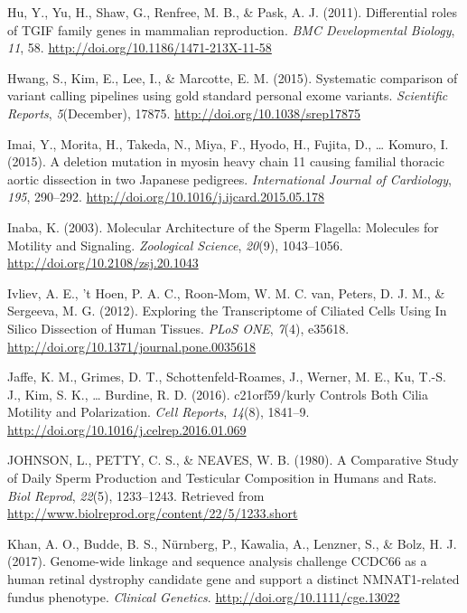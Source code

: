 \documentclass[12pt,twoside]{reedthesis}
\theoremstyle{definition}
\theoremstyle{definition}
\theoremstyle{remark}
\begin{document}
  \hypertarget{ref-Hu2011}{}
  Hu, Y., Yu, H., Shaw, G., Renfree, M. B., \& Pask, A. J. (2011).
  Differential roles of TGIF family genes in mammalian reproduction.
  \emph{BMC Developmental Biology}, \emph{11}, 58.
  \url{http://doi.org/10.1186/1471-213X-11-58}
  
  \hypertarget{ref-Hwang2015}{}
  Hwang, S., Kim, E., Lee, I., \& Marcotte, E. M. (2015). Systematic
  comparison of variant calling pipelines using gold standard personal
  exome variants. \emph{Scientific Reports}, \emph{5}(December), 17875.
  \url{http://doi.org/10.1038/srep17875}
  
  \hypertarget{ref-Imai2015}{}
  Imai, Y., Morita, H., Takeda, N., Miya, F., Hyodo, H., Fujita, D.,
  \ldots{} Komuro, I. (2015). A deletion mutation in myosin heavy chain 11
  causing familial thoracic aortic dissection in two Japanese pedigrees.
  \emph{International Journal of Cardiology}, \emph{195}, 290--292.
  \url{http://doi.org/10.1016/j.ijcard.2015.05.178}
  
  \hypertarget{ref-Inaba2003}{}
  Inaba, K. (2003). Molecular Architecture of the Sperm Flagella:
  Molecules for Motility and Signaling. \emph{Zoological Science},
  \emph{20}(9), 1043--1056. \url{http://doi.org/10.2108/zsj.20.1043}
  
  \hypertarget{ref-Ivliev2012}{}
  Ivliev, A. E., 't Hoen, P. A. C., Roon-Mom, W. M. C. van, Peters, D. J.
  M., \& Sergeeva, M. G. (2012). Exploring the Transcriptome of Ciliated
  Cells Using In Silico Dissection of Human Tissues. \emph{PLoS ONE},
  \emph{7}(4), e35618. \url{http://doi.org/10.1371/journal.pone.0035618}
  
  \hypertarget{ref-Jaffe2016}{}
  Jaffe, K. M., Grimes, D. T., Schottenfeld-Roames, J., Werner, M. E., Ku,
  T.-S. J., Kim, S. K., \ldots{} Burdine, R. D. (2016). c21orf59/kurly
  Controls Both Cilia Motility and Polarization. \emph{Cell Reports},
  \emph{14}(8), 1841--9. \url{http://doi.org/10.1016/j.celrep.2016.01.069}
  
  \hypertarget{ref-Johnson1980}{}
  JOHNSON, L., PETTY, C. S., \& NEAVES, W. B. (1980). A Comparative Study
  of Daily Sperm Production and Testicular Composition in Humans and Rats.
  \emph{Biol Reprod}, \emph{22}(5), 1233--1243. Retrieved from
  \url{http://www.biolreprod.org/content/22/5/1233.short}
  
  \hypertarget{ref-Khan2017}{}
  Khan, A. O., Budde, B. S., Nürnberg, P., Kawalia, A., Lenzner, S., \&
  Bolz, H. J. (2017). Genome-wide linkage and sequence analysis challenge
  CCDC66 as a human retinal dystrophy candidate gene and support a
  distinct NMNAT1-related fundus phenotype. \emph{Clinical Genetics}.
  \url{http://doi.org/10.1111/cge.13022}
  
\end{document}
